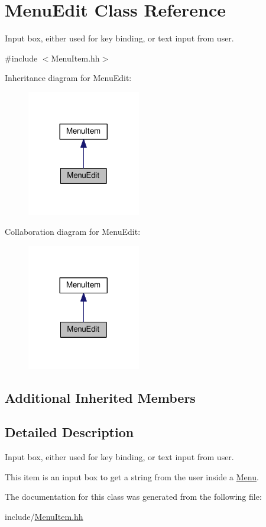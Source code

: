 \hypertarget{classMenuEdit}{}\section{Menu\+Edit Class Reference}
\label{classMenuEdit}


Input box, either used for key binding, or text input from user.  




{\ttfamily \#include $<$Menu\+Item.\+hh$>$}



Inheritance diagram for Menu\+Edit\+:\nopagebreak
\begin{figure}[H]
\begin{center}
\leavevmode
\includegraphics[width=140pt]{classMenuEdit__inherit__graph}
\end{center}
\end{figure}


Collaboration diagram for Menu\+Edit\+:\nopagebreak
\begin{figure}[H]
\begin{center}
\leavevmode
\includegraphics[width=140pt]{classMenuEdit__coll__graph}
\end{center}
\end{figure}
\subsection*{Additional Inherited Members}


\subsection{Detailed Description}
Input box, either used for key binding, or text input from user. 

This item is an input box to get a string from the user inside a \hyperlink{classMenu}{Menu}. 

The documentation for this class was generated from the following file\+:\begin{DoxyCompactItemize}
\item 
include/\hyperlink{MenuItem_8hh}{Menu\+Item.\+hh}\end{DoxyCompactItemize}
